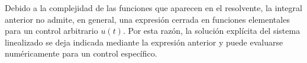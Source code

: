 \documentclass{uofa-eng-assignment}
\begin{document}
Debido a la complejidad de las funciones que aparecen en el resolvente, la integral anterior no admite, en general, una expresión cerrada en funciones elementales para un control arbitrario $u(t)$. Por esta razón, la solución explícita del sistema linealizado se deja indicada mediante la expresión anterior y puede evaluarse numéricamente para un control específico.
\end{document}
